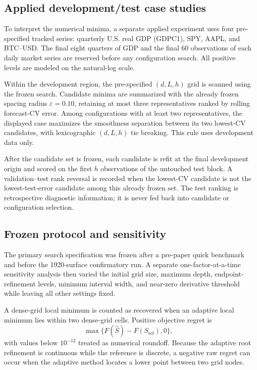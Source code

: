 \documentclass[english]{smcca}
\begin{document}
\subsection{Applied development/test case studies}

To interpret the numerical minima, a separate applied experiment uses four
pre-specified tracked series: quarterly U.S. real GDP (GDPC1), SPY, AAPL, and
BTC--USD. The final eight quarters of GDP and the final 60 observations of each
daily market series are reserved before any configuration search. All positive
levels are modeled on the natural-log scale.

Within the development region, the pre-specified \((d,L,h)\) grid is scanned
using the frozen search. Candidate minima are summarized with the already
frozen spacing radius \(\varepsilon=0.10\), retaining at most three
representatives ranked by rolling forecast-CV error. Among configurations with
at least two representatives, the displayed case maximizes the smoothness
separation between its two lowest-CV candidates, with lexicographic
\((d,L,h)\) tie breaking. This rule uses development data only.

After the candidate set is frozen, each candidate is refit at the final
development origin and scored on the first \(h\) observations of the untouched
test block. A validation--test rank reversal is recorded when the lowest-CV
candidate is not the lowest-test-error candidate among this already frozen set.
The test ranking is retrospective diagnostic information; it is never fed back
into candidate or configuration selection.

\subsection{Frozen protocol and sensitivity}

The primary search specification was frozen after a pre-paper quick benchmark and before the 1920-surface confirmatory run. A separate one-factor-at-a-time sensitivity analysis then varied the initial grid size, maximum depth, endpoint-refinement levels, minimum interval width, and near-zero derivative threshold while leaving all other settings fixed.

A dense-grid local minimum is counted as recovered when an adaptive local minimum lies within two dense-grid cells. Positive objective regret is
\[
\max\{F(\widehat S)-F(S_{\mathrm{ref}}),0\},
\]
with values below \(10^{-12}\) treated as numerical roundoff. Because the adaptive root refinement is continuous while the reference is discrete, a negative raw regret can occur when the adaptive method locates a lower point between two grid nodes.
\end{document}
